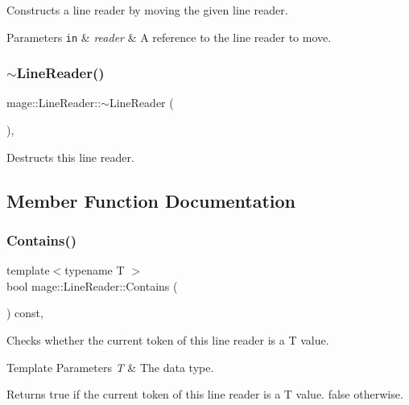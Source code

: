 Constructs a line reader by moving the given line reader.


\begin{DoxyParams}[1]{Parameters}
\mbox{\tt in}  & {\em reader} & A reference to the line reader to move. \\
\hline
\end{DoxyParams}
\mbox{\label{classmage_1_1_line_reader_ad9753ea392ebe5b3867852d3392fb1e7}} 
\subsubsection{\texorpdfstring{$\sim$\+Line\+Reader()}{~LineReader()}}
{\footnotesize\ttfamily mage\+::\+Line\+Reader\+::$\sim$\+Line\+Reader (\begin{DoxyParamCaption}{ }\end{DoxyParamCaption})\hspace{0.3cm}{\ttfamily [protected]}, {\ttfamily [default]}}

Destructs this line reader. 

\subsection{Member Function Documentation}
\mbox{\label{classmage_1_1_line_reader_a89a31254af144fd0c9e7f684cdaa28e7}} 
\subsubsection{\texorpdfstring{Contains()}{Contains()}}
{\footnotesize\ttfamily template$<$typename T $>$ \\
bool mage\+::\+Line\+Reader\+::\+Contains (\begin{DoxyParamCaption}{ }\end{DoxyParamCaption}) const\hspace{0.3cm}{\ttfamily [protected]}, {\ttfamily [noexcept]}}

Checks whether the current token of this line reader is a {\ttfamily T} value.


\begin{DoxyTemplParams}{Template Parameters}
{\em T} & The data type. \\
\hline
\end{DoxyTemplParams}
\begin{DoxyReturn}{Returns}
{\ttfamily true} if the current token of this line reader is a {\ttfamily T} value. {\ttfamily false} otherwise. 
\end{DoxyReturn}
\mbox{\label{classmage_1_1_line_reader_aeb88e4082cfe3ae1ff84a82fcde26298}} 
